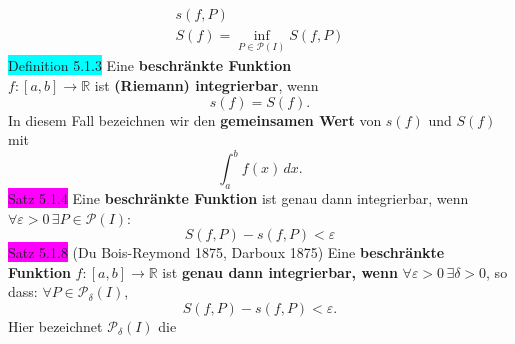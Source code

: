 \documentclass[landscape, 10pt]{article}
\newcommand{\R}{\mathbb{R}}
\begin{document}
\begin{multicols}{3}
\begin{align*}
                            s(f,P)\\
                            S(f)=\inf
                            \limits_{P\in\mathcal{P}(I)}
                            S(f,P)
                     \end{align*}
              \colorbox{cyan}{Definition 5.1.3} 
                     Eine \textbf{beschränkte Funktion} \\
                     \textcolor{NavyBlue}{
                     $f:[a,b]\longrightarrow\R$} 
                     ist \textbf{(Riemann) integrierbar}, 
                     wenn 
                     \begin{equation*}
                            s(f)=S(f).
                     \end{equation*}
                     In diesem Fall 
                     bezeichnen wir den \textbf{gemeinsamen Wert} 
                     von \textcolor{NavyBlue}{$s(f)$} und 
                     \textcolor{NavyBlue}{$S(f)$} mit 
                     \begin{equation*}
                            \int_a^bf(x)\,dx.
                     \end{equation*}
              \colorbox{magenta}{Satz 5.1.4} 
              Eine \textbf{beschränkte Funktion} ist 
                     genau dann integrierbar, wenn 
                     \textcolor{NavyBlue}{
                     $\forall\varepsilon>0\,
                     \exists P\in\mathcal{P}(I)$}:
                     \begin{equation*}
                            S(f,P)-s(f,P)<\varepsilon
                     \end{equation*}
              \colorbox{magenta}{Satz 5.1.8} 
              (Du Bois-Reymond 1875, Darboux 1875) 
                     Eine \textbf{beschränkte Funktion} 
                     \textcolor{NavyBlue}{
                     $f:[a,b]\longrightarrow\R$} 
                     ist \textbf{genau dann 
                     integrierbar, wenn} 
                     \textcolor{NavyBlue}{
                     $\forall\varepsilon>0\,
                     \exists\delta>0$}, 
                     so dass: \textcolor{NavyBlue}{
                     $\forall P\in\mathcal{P}_\delta(I)$},\,
                     \begin{equation*}
                            S(f,P)-s(f,P)<\varepsilon.   
                     \end{equation*}
                     Hier bezeichnet 
                     \textcolor{NavyBlue}{
                     $\mathcal{P}_\delta(I)$} die 

\end{multicols}
\end{document}
